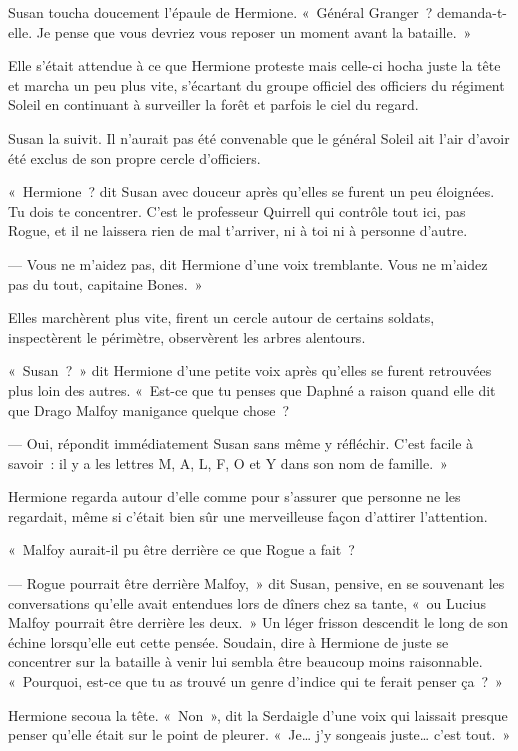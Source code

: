 Susan toucha doucement l'épaule de Hermione. «~Général Granger~? demanda-t-elle. Je pense que vous devriez vous reposer un moment avant la bataille.~»

Elle s'était attendue à ce que Hermione proteste mais celle-ci hocha juste la tête et marcha un peu plus vite, s'écartant du groupe officiel des officiers du régiment Soleil en continuant à surveiller la forêt et parfois le ciel du regard.

Susan la suivit. Il n'aurait pas été convenable que le général Soleil ait l'air d'avoir été exclus de son propre cercle d'officiers.

«~Hermione~? dit Susan avec douceur après qu'elles se furent un peu éloignées. Tu dois te concentrer. C'est le professeur Quirrell qui contrôle tout ici, pas Rogue, et il ne laissera rien de mal t'arriver, ni à toi ni à personne d'autre.

--- Vous ne m'aidez pas, dit Hermione d'une voix tremblante. Vous ne m'aidez pas du tout, capitaine Bones.~»

Elles marchèrent plus vite, firent un cercle autour de certains soldats, inspectèrent le périmètre, observèrent les arbres alentours.

«~Susan~?~» dit Hermione d'une petite voix après qu'elles se furent retrouvées plus loin des autres. «~Est-ce que tu penses que Daphné a raison quand elle dit que Drago Malfoy manigance quelque chose~?

--- Oui, répondit immédiatement Susan sans même y réfléchir. C'est facile à savoir~: il y a les lettres M, A, L, F, O et Y dans son nom de famille.~»

Hermione regarda autour d'elle comme pour s'assurer que personne ne les regardait, même si c'était bien sûr une merveilleuse façon d'attirer l'attention.

«~Malfoy aurait-il pu être derrière ce que Rogue a fait~?

--- Rogue pourrait être derrière Malfoy,~» dit Susan, pensive, en se souvenant les conversations qu'elle avait entendues lors de dîners chez sa tante, «~ou Lucius Malfoy pourrait être derrière les deux.~» Un léger frisson descendit le long de son échine lorsqu'elle eut cette pensée. Soudain, dire à Hermione de juste se concentrer sur la bataille à venir lui sembla être beaucoup moins raisonnable. «~Pourquoi, est-ce que tu as trouvé un genre d'indice qui te ferait penser ça~?~»

Hermione secoua la tête. «~Non~», dit la Serdaigle d'une voix qui laissait presque penser qu'elle était sur le point de pleurer. «~Je… j'y songeais juste… c'est tout.~»

